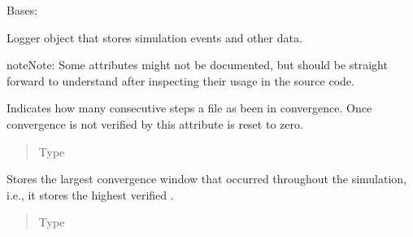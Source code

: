 \documentclass[letterpaper,10pt,english]{sphinxmanual}
\begin{document}
\begin{fulllineitems}
\label{\detokenize{app.domain.helpers:app.domain.helpers.smart_dataclasses.LoggingData}}
Bases: 

Logger object that stores simulation events and other data.

\begin{sphinxadmonition}{note}{Note:}
Some attributes might not be documented, but should be straight
forward to understand after inspecting their usage in the source code.
\end{sphinxadmonition}

\begin{fulllineitems}
\label{\detokenize{app.domain.helpers:app.domain.helpers.smart_dataclasses.LoggingData.cswc}}
Indicates how many consecutive steps a file as been in
convergence. Once convergence is not verified by
this attribute is reset to zero.
\begin{quote}\begin{description}
\item[{Type}] \leavevmode
{}

\end{description}\end{quote}

\end{fulllineitems}


\begin{fulllineitems}
\label{\detokenize{app.domain.helpers:app.domain.helpers.smart_dataclasses.LoggingData.largest_convergence_window}}
Stores the largest convergence window that occurred throughout
the simulation, i.e., it stores the highest verified
{\hyperref[\detokenize{app.domain.helpers:app.domain.helpers.smart_dataclasses.LoggingData.cswc}]{}}.
\begin{quote}\begin{description}
\item[{Type}] \leavevmode
{}


\end{description}
\end{quote}
\end{fulllineitems}
\end{fulllineitems}
\end{document}
